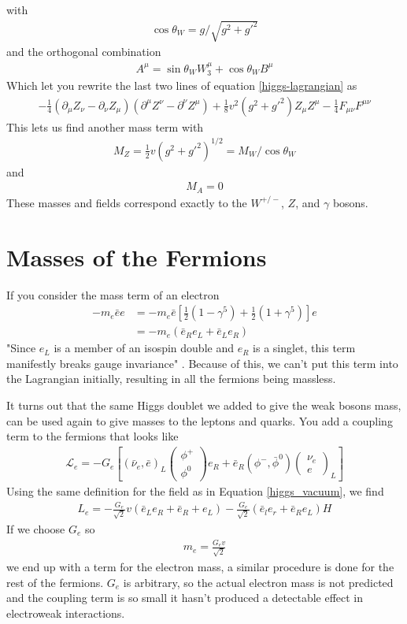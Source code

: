 with 
\begin{align}
\cos\theta_W = g/\sqrt{g^2+g'^2}
\end{align}
and the orthogonal combination
\begin{align}
A^\mu = \sin\theta_W W_3^\mu + \cos\theta_W B^\mu
\end{align}
Which let you rewrite the last two lines of equation \ref{higgs-lagrangian} as
\begin{align}
-\frac{1}{4}(\partial_\mu Z_\nu - \partial_\nu Z_\mu)(\partial^\mu Z^\nu -\partial^\nu Z^\mu) + \frac{1}{8}v^2(g^2 + g'^2)Z_\mu Z^\mu - \frac{1}{4}F_{\mu\nu}F^{\mu\nu}
\end{align}
This lets us find another mass term with
\begin{align}
M_Z = \frac{1}{2}v(g^2+g'^2)^{1/2} = M_W/\cos\theta_W
\end{align}
and
\begin{align}
M_A = 0
\end{align}
These masses and fields correspond exactly to the $W^{+/-}$, $Z$, and $\gamma$ bosons.
\section{Masses of the Fermions}
 If you consider the mass term of an electron
\begin{align}
-m_e\bar{e}e &= -m_e\bar{e}[\frac{1}{2}(1-\gamma^5)+\frac{1}{2}(1+\gamma^5)]e\\&= -m_e(\bar{e}_R e_L + \bar{e}_L e_R)
\end{align}
"Since $e_L$ is a member of an isospin double and $e_R$ is a singlet, this term manifestly breaks gauge invariance" \cite{halzen}. Because of this, we can't put this term into the Lagrangian initially, resulting in all the fermions being massless.

It turns out that the same Higgs doublet we added to give the weak bosons mass, can be used again to give masses to the leptons and quarks. You add a coupling term to the fermions that looks like
\begin{align}
\mathcal{L}_e = -G_e\left[ (\bar{\nu}_e,\bar{e})_L\begin{pmatrix}
\phi^+\\
\phi^0
\end{pmatrix}e_R + \bar{e}_R(\phi^-,\bar{\phi}^0)\begin{pmatrix}
\nu_e\\
e
\end{pmatrix}_L\right]
\end{align}
Using the same definition for the field as in Equation \ref{higgs_vacuum}, we find
\begin{align}
L_e = -\frac{G_e}{\sqrt{2}}v(\bar{e}_Le_R+\bar{e}_R+e_L) -\frac{G_e}{\sqrt{2}}(\bar{e}_le_r+\bar{e}_Re_L)H
\end{align}
If we choose $G_e$ so
\begin{align}
m_e = \frac{G_ev}{\sqrt{2}}
\end{align}
we end up with a term for the electron mass, a similar procedure is done for the rest of the fermions. $G_e$ is arbitrary, so the actual electron mass is not predicted and the coupling term is so small it hasn't produced a detectable effect in electroweak interactions.

